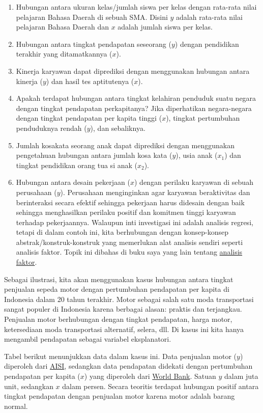 \documentclass[
]{book}
\providecommand{\tightlist}{%
  \setlength{\itemsep}{0pt}\setlength{\parskip}{0pt}}
\begin{document}
\begin{enumerate}
\def\labelenumi{\arabic{enumi}.}
\tightlist
\item
  Hubungan antara ukuran kelas/jumlah siswa per kelas dengan rata-rata
  nilai pelajaran Bahasa Daerah di sebuah SMA. Disini \(y\) adalah
  rata-rata nilai pelajaran Bahasa Daerah dan \(x\) adalah jumlah siswa
  per kelas.
\item
  Hubungan antara tingkat pendapatan seseorang (\(y\)) dengan pendidikan
  terakhir yang ditamatkannya (\(x\)).
\item
  Kinerja karyawan dapat diprediksi dengan menggunakan hubungan antara
  kinerja (\(y\)) dan hasil tes aptitutenya (\(x\)).
\item
  Apakah terdapat hubungan antara tingkat kelahiran penduduk suatu
  negara dengan tingkat pendapatan perkapitanya? Jika diperhatikan
  negara-negara dengan tingkat pendapatan per kapita tinggi (\(x\)),
  tingkat pertumbuhan penduduknya rendah (\(y\)), dan sebaliknya.
\item
  Jumlah kosakata seorang anak dapat diprediksi dengan menggunakan
  pengetahuan hubungan antara jumlah kosa kata (\(y\)), usia anak
  (\(x_1\)) dan tingkat pendidikan orang tua si anak (\(x_2\)).
\item
  Hubungan antara desain pekerjaan (\(x\)) dengan perilaku karyawan di
  sebuah perusahaan (\(y\)). Perusahaan menginginkan agar karyawan
  beraktivitas dan berinteraksi secara efektif sehingga pekerjaan
  harus didesain dengan baik sehingga menghasilkan perilaku positif
  dan komitmen tinggi karyawan terhadap pekerjaannya. Walaupun inti
  investigasi ini adalah analisis regresi, tetapi di dalam contoh ini,
  kita berhubungan dengan konsep-konsep abstrak/konstruk-konstruk yang
  memerlukan alat analisis sendiri seperti analisis faktor. Topik ini
  dibahas di buku saya yang lain tentang \href{https://bangtedy.github.io/analisisfaktor/}{analisis faktor}.
\end{enumerate}

Sebagai ilustrasi, kita akan menggunakan kasus hubungan antara tingkat
penjualan sepeda motor dengan pertumbuhan pendapatan per kapita di
Indonesia dalam 20 tahun terakhir. Motor sebagai salah satu moda
transportasi sangat populer di Indonesia karena berbagai alasan: praktis
dan terjangkau. Penjualan motor berhubungan dengan tingkat pendapatan,
harga motor, ketersediaan moda transportasi alternatif, selera, dll. Di
kasus ini kita hanya mengambil pendapatan sebagai variabel eksplanatori.

Tabel berikut menunjukkan data dalam kasus ini. Data penjualan motor (\(y\))
diperoleh dari \href{https://www.aisi.or.id/}{AISI}, sedangkan data
pendapatan didekati dengan pertumbuhan pendapatan per kapita (\(x\)) yang
diperoleh dari \href{https://datacatalog.worldbank.org/home}{World Bank}.
Satuan \(y\) dalam juta unit, sedangkan \(x\) dalam persen. Secara teoritis
terdapat hubungan positif antara tingkat pendapatan dengan penjualan
motor karena motor adalah barang normal.
\end{document}
